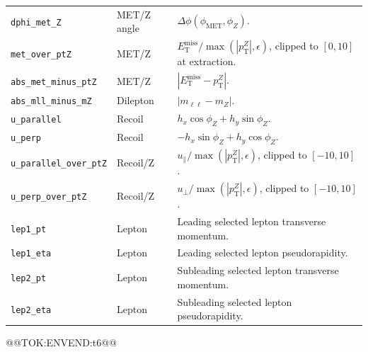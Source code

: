 \documentclass[11pt]{article}
\newcommand{\MET}{\ensuremath{E_{\mathrm{T}}^{\mathrm{miss}}}}
\begin{document}
\begin{table}[h]
\begin{tabular}{>{\raggedright\arraybackslash}p{}>{\raggedright\arraybackslash}p{}>{\raggedright\arraybackslash}p{}}
\texttt{dphi\_met\_Z} & MET/Z angle & \(\Delta\phi(\phi_{\mathrm{MET}},\phi_Z)\). \\
\texttt{met\_over\_ptZ} & MET/Z & \(\MET/\max(|p_{\mathrm{T}}^Z|,\epsilon)\), clipped to \([0,10]\) at extraction. \\
\texttt{abs\_met\_minus\_ptZ} & MET/Z & \(|\MET-p_{\mathrm{T}}^Z|\). \\
\texttt{abs\_mll\_minus\_mZ} & Dilepton & \(|m_{\ell\ell}-m_Z|\). \\
\texttt{u\_parallel} & Recoil & \(h_x\cos\phi_Z+h_y\sin\phi_Z\). \\
\texttt{u\_perp} & Recoil & \(-h_x\sin\phi_Z+h_y\cos\phi_Z\). \\
\texttt{u\_parallel\_over\_ptZ} & Recoil/Z & \(u_{\parallel}/\max(|p_{\mathrm{T}}^Z|,\epsilon)\), clipped to \([-10,10]\). \\
\texttt{u\_perp\_over\_ptZ} & Recoil/Z & \(u_{\perp}/\max(|p_{\mathrm{T}}^Z|,\epsilon)\), clipped to \([-10,10]\). \\
\texttt{lep1\_pt} & Lepton & Leading selected lepton transverse momentum. \\
\texttt{lep1\_eta} & Lepton & Leading selected lepton pseudorapidity. \\
\texttt{lep2\_pt} & Lepton & Subleading selected lepton transverse momentum. \\
\texttt{lep2\_eta} & Lepton & Subleading selected lepton pseudorapidity. \\
\bottomrule
\end{tabular}
@@TOK:ENVEND:t6@@\end{table}
\end{document}
